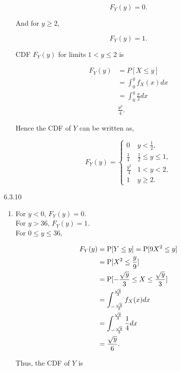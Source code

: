 \documentclass{article}
\begin{document}
\begin{enumerate}
\begin{enumerate}[label=(\alph*)]
        $$F_Y(y) = 0.$$

        And for $y \ge 2$,

        $$F_Y(y) = 1.$$
    
        CDF $F_Y(y)$ for limits $1 < y \le 2$ is

        \begin{align*}
            F_Y(y) & = P[X \le y] \\
                & = \int_0^y f_X(x) dx \\
                & = \int_0^y \frac{x}{2} dx \\
                & \frac{y^2}{4}.
        \end{align*}

        Hence the CDF of $Y$ can be written as,

        $$F_Y(y) = \begin{cases}
            0 & y < \frac{1}{2}, \\
            \frac{1}{4} & \frac{1}{2} \le y \le 1, \\
            \frac{y^2}{4} & 1 < y < 2, \\
            1 & y \ge 2.
        \end{cases}
        $$

    \end{enumerate}

    \item [6.3.10]
    \begin{enumerate}[label=(\alph*)]
        \item 
        For $y < 0$, $F_Y(y) = 0$. \\
        For $y > 36$, $F_Y(y) = 1$. \\
        For $0 \le y \le 36$, 
        
        \begin{align*}
        F_Y(y) & = \text P[Y \le y] = \text P[9X^2 \le y] \\
        & = \text P[X^2 \le \frac{y}{9}] \\
        & = \text P[-\frac{\sqrt y}{3} \le X \le \frac{\sqrt y}{3}] \\
        & = \int_{-\frac{\sqrt y}{3}}^{\frac{\sqrt y}{3}} f_X(x) dx \\
        & = \int_{-\frac{\sqrt y}{3}}^{\frac{\sqrt y}{3}} \frac{1}{4} dx \\
        & = \frac{\sqrt y}{6}.
        \end{align*}

        Thus, the CDF of $Y$ is


\end{enumerate}
\end{enumerate}
\end{document}
